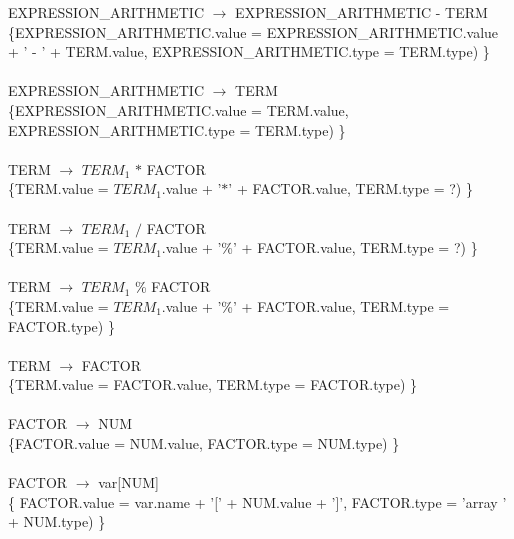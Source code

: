 \documentclass[10pt,a4paper]{article}
\begin{document}
{{{EXPRESSION\_ARITHMETIC $\rightarrow$ EXPRESSION\_ARITHMETIC - TERM  \\

\{EXPRESSION\_ARITHMETIC.value =  EXPRESSION\_ARITHMETIC.value + ' - ' + TERM.value, EXPRESSION\_ARITHMETIC.type = TERM.type) \}  \\ \\


EXPRESSION\_ARITHMETIC $\rightarrow$ TERM \\

\{EXPRESSION\_ARITHMETIC.value = TERM.value, EXPRESSION\_ARITHMETIC.type = TERM.type) \}  \\ \\


TERM $\rightarrow$ $TERM_{1}$ $*$ FACTOR   \\

\{TERM.value = $TERM_{1}$.value + '$*$' + FACTOR.value, TERM.type = ?) \}  \\ \\


TERM $\rightarrow$ $TERM_{1}$ $/$ FACTOR   \\

\{TERM.value = $TERM_{1}$.value + '\%' + FACTOR.value, TERM.type = ?) \}  \\ \\


TERM $\rightarrow$ $TERM_{1}$ \% FACTOR  \\

\{TERM.value = $TERM_{1}$.value + '\%' + FACTOR.value, TERM.type = FACTOR.type) \}  \\ \\


TERM $\rightarrow$ FACTOR \\

\{TERM.value = FACTOR.value, TERM.type = FACTOR.type) \}  \\ \\


FACTOR $\rightarrow$ NUM   \\

\{FACTOR.value = NUM.value, FACTOR.type = NUM.type) \}  \\ \\


FACTOR $\rightarrow$ var[NUM]  \\ 

\{ FACTOR.value = var.name + '[' + NUM.value + ']', FACTOR.type = 'array ' + NUM.type) \}  \\ 
\\

}}}
\end{document}
